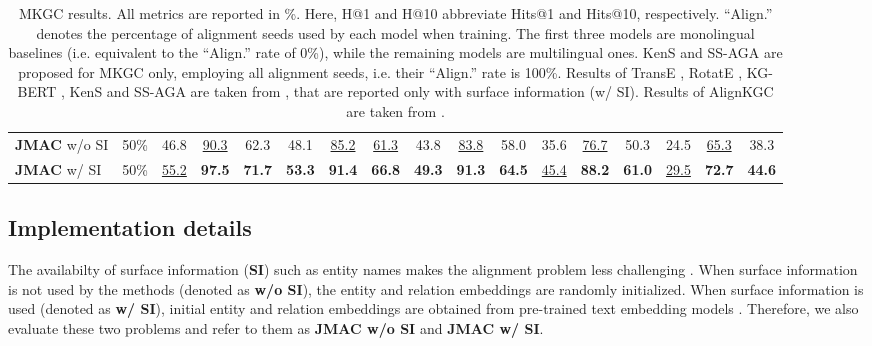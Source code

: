 \documentclass[11pt]{article}
\begin{document}
\begin{table*}[!t]
\begin{adjustbox}{width=440pt,center}
\begin{tabular}{l|l|ccc|ccc|ccc|ccc|ccc}
    \textbf{JMAC} w/o SI & 50\% & {46.8} & \underline{90.3} & {62.3} & {48.1} & \underline{85.2} & \underline{61.3} & {43.8} & \underline{83.8} & {58.0} & {35.6} & \underline{76.7} & {50.3} & {24.5} & \underline{65.3} & {38.3} \\
    
    \textbf{JMAC} w/ SI & 50\% & \underline{55.2} & \bf 97.5 & \bf 71.7 & \bf 53.3 & \bf 91.4 & \bf 66.8 & \bf 49.3 & \bf 91.3 & \bf 64.5 & \underline{45.4} & \bf 88.2 & \bf 61.0 & \underline{29.5} & \bf 72.7 & \bf 44.6 \\
    \hline 
\end{tabular}
    \end{adjustbox}
    \caption{MKGC results. All metrics are reported in \%. Here, H@1 and H@10 abbreviate Hits@1 and Hits@10, respectively. ``Align.'' denotes the percentage of alignment seeds used by each model when training. 
    The first three models are monolingual baselines (i.e. equivalent to the ``Align.'' rate of 0\%), while the remaining models are multilingual ones. {KenS} \cite{chen2020multilingual} and {SS-AGA} \cite{huang2022multilingual} are proposed for MKGC only, employing all alignment seeds, i.e. their ``Align.'' rate is 100\%. 
    Results of {TransE} \cite{bordes2013translating}, {RotatE} \cite{sun2019rotate}, {KG-BERT} \cite{kgbert}, {KenS}  and {SS-AGA}  are taken from , that are reported only with surface information (w/ SI). Results of {AlignKGC} \cite{singh2021multilingual} are taken from .}
    \label{tab:kgc_talbe}
\end{table*}




\subsection{Implementation details}\label{ssec:implementation}


The availabilty of surface information (\textbf{SI}) such as entity names makes the alignment problem less challenging \cite{xiang2021ontoea}. When surface information is not used by the methods (denoted as \textbf{w/o SI}), the entity and relation embeddings are randomly initialized. When surface information is used (denoted as \textbf{w/ SI}), initial entity and relation embeddings are obtained from pre-trained text embedding models \cite{singh2021multilingual,huang2022multilingual}. Therefore, we also evaluate these two problems and refer to them as \textbf{JMAC w/o SI} and \textbf{JMAC w/ SI}.  
\end{document}

